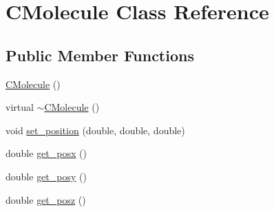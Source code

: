 \hypertarget{classCMolecule}{}\section{C\+Molecule Class Reference}
\label{classCMolecule}
\subsection*{Public Member Functions}
\begin{DoxyCompactItemize}
\item 
\mbox{\hyperlink{classCMolecule_a6e4328f4451a293bb1405bbde90a4ced}{C\+Molecule}} ()
\item 
virtual \mbox{\hyperlink{classCMolecule_a8e59e7e7ff05b619a9e201c3263921c5}{$\sim$\+C\+Molecule}} ()
\item 
void \mbox{\hyperlink{classCMolecule_ad9a66ae676bd9ed1012f0c6e952369e0}{set\+\_\+position}} (double, double, double)
\item 
double \mbox{\hyperlink{classCMolecule_ac76dbb1e5abbc9fbadcd568d0f2e7d16}{get\+\_\+posx}} ()
\item 
double \mbox{\hyperlink{classCMolecule_a8cf1a6b995c8cbf4f1881f6f38ebca02}{get\+\_\+posy}} ()
\item 
double \mbox{\hyperlink{classCMolecule_a69483e3d6820a96f004ba6c78f8d166e}{get\+\_\+posz}} ()
\end{DoxyCompactItemize}
